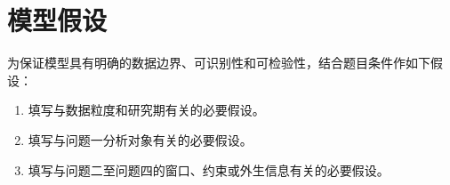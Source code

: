 \section{模型假设}

为保证模型具有明确的数据边界、可识别性和可检验性，结合题目条件作如下假设：
\begin{enumerate}[label=\arabic*.,leftmargin=2.3em]
  \item 填写与数据粒度和研究期有关的必要假设。
  \item 填写与问题一分析对象有关的必要假设。
  \item 填写与问题二至问题四的窗口、约束或外生信息有关的必要假设。
\end{enumerate}

